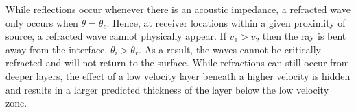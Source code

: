 While reflections occur whenever there is an acoustic impedance, a refracted wave only occurs when $\theta = \theta_c$.  Hence, at receiver locations within a given proximity of source, a refracted wave cannot physically appear.  If $v_1 > v_2$ then the ray is bent away from the interface, $\theta_i > \theta_r$.  As a result, the waves cannot be critically refracted and will not return to the surface.  While refractions can still occur from deeper layers, the effect of a low velocity layer beneath a higher velocity is hidden and results in a larger predicted thickness of the layer below the low velocity zone.


\nocite{Grant&West1965}



